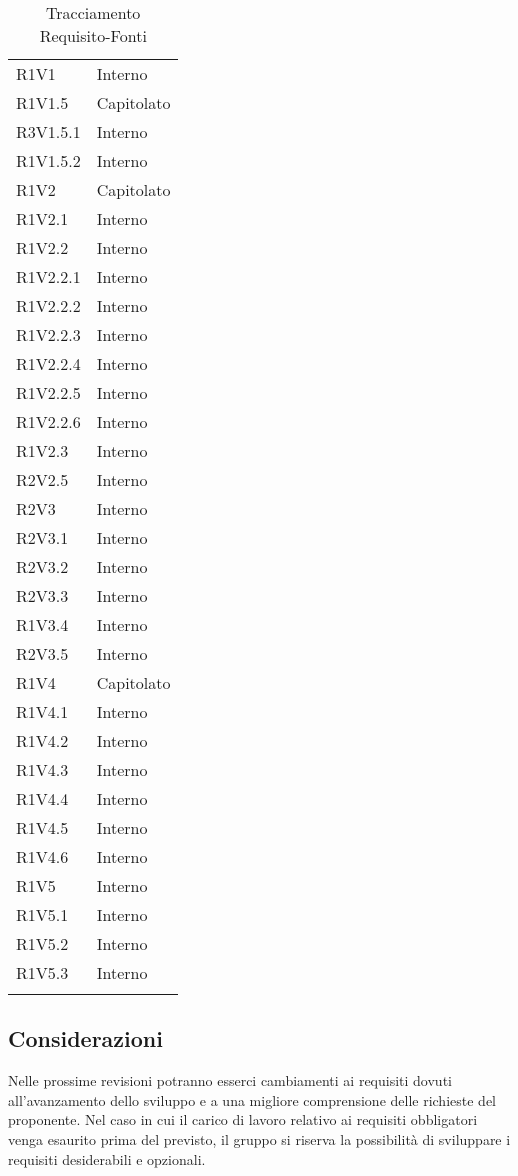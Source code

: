 \begin{longtable} {
			>{\centering}p{28mm}  
			>{}p{20mm}
		}
		R1V1 & Interno \TBstrut \\ [2mm]
		R1V1.5 & Capitolato \TBstrut \\ [2mm]
		R3V1.5.1 & Interno \TBstrut \\ [2mm]
		R1V1.5.2 & Interno \TBstrut \\ [2mm]
		R1V2 & Capitolato \TBstrut \\ [2mm]
		R1V2.1 & Interno \TBstrut \\ [2mm]
		R1V2.2 & Interno \TBstrut \\ [2mm]
		R1V2.2.1 & Interno \TBstrut \\ [2mm]
		R1V2.2.2 & Interno \TBstrut \\ [2mm]
		R1V2.2.3 & Interno \TBstrut \\ [2mm]
		R1V2.2.4 & Interno \TBstrut \\ [2mm]
		R1V2.2.5 & Interno \TBstrut \\ [2mm]
		R1V2.2.6 & Interno \TBstrut \\ [2mm]
		R1V2.3 & Interno \TBstrut \\ [2mm]
		R2V2.5 & Interno \TBstrut \\ [2mm]
		R2V3 & Interno \TBstrut \\ [2mm]
		R2V3.1 & Interno \TBstrut \\ [2mm]
		R2V3.2 & Interno \TBstrut \\ [2mm]
		R2V3.3 & Interno \TBstrut \\ [2mm]
		R1V3.4 & Interno \TBstrut \\ [2mm]
		R2V3.5 & Interno \TBstrut \\ [2mm]
		R1V4 & Capitolato \TBstrut \\ [2mm]
		R1V4.1 & Interno \TBstrut \\ [2mm]
		R1V4.2 & Interno \TBstrut \\ [2mm]
		R1V4.3 & Interno \TBstrut \\ [2mm]
		R1V4.4 & Interno \TBstrut \\ [2mm]
		R1V4.5 & Interno \TBstrut \\ [2mm]
		R1V4.6 & Interno \TBstrut \\ [2mm]
		R1V5 & Interno \TBstrut \\ [2mm]
		R1V5.1 & Interno \TBstrut \\ [2mm]
		R1V5.2 & Interno \TBstrut \\ [2mm]
		R1V5.3 & Interno \TBstrut \\ [2mm]
		\rowcolor{white}
		\caption{Tracciamento Requisito-Fonti}
	\end{longtable}
	\subsection{Considerazioni}
	Nelle prossime revisioni potranno esserci cambiamenti ai requisiti dovuti all'avanzamento dello sviluppo e a una migliore comprensione delle richieste del proponente. Nel caso in cui il carico di lavoro relativo ai requisiti obbligatori venga esaurito prima del previsto, il gruppo si riserva la possibilità di sviluppare i requisiti desiderabili e opzionali.
